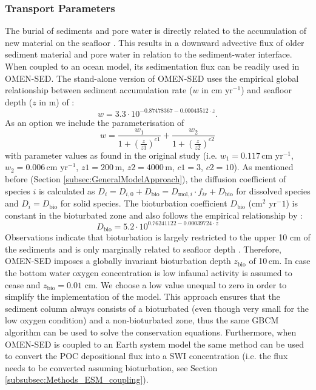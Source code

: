 \documentclass[gmd, manuscript]{copernicus}
\begin{document}
\subsubsection{Transport Parameters}
The burial of sediments and pore water is directly related to the accumulation of new material on the seafloor \citep[i.e. sedimentation,][]{burdige2006geochemistry}. 
This results in a downward advective flux of older sediment material and pore water in relation to the sediment-water interface. When coupled to an ocean model, its sedimentation flux can be readily used in OMEN-SED. 
The stand-alone version of OMEN-SED uses the empirical global relationship between sediment accumulation rate ($w$ in cm yr$^{-1}$) and seafloor depth ($z$ in m) of \citet{middelburg_empirical_1997}: 
\begin{equation}
 w = 3.3\cdot 10^{-0.87478367-0.00043512\cdot z}\label{eq:sedimentation_rate}.
\end{equation}
As an option we include the parameterisation of \citet{burwicz_estimation_2011} 
\begin{equation}
 w = \frac{w_1}{1 + (\frac{z}{z1})^{c1}} + \frac{w_2}{1 + (\frac{z}{z2})^{c2}}\label{eq:sedimentation_rate_Burwicz}
\end{equation}
with parameter values as found in the original study (i.e. $w_1=0.117$\,cm yr$^{-1}$, $w_2=0.006$\,cm yr$^{-1}$, $z1=200$\,m, $z2=4000$\,m, $c1=3$, $c2=10$).
As mentioned before (Section \ref{subsec:GeneralModelApproach}), the diffusion coefficient of species $i$ is calculated as $D_i=D_{i,0}+D_{\mathrm{bio}}=D_{\mathrm{mol},i}\cdot f_{ir}+D_{\mathrm{bio}}$ for dissolved species and $D_i=D_{\mathrm{bio}}$ for solid species. 
The bioturbation coefficient $D_{\mathrm{bio}}$ (cm$^2$ yr$^-1$) is constant in the bioturbated zone and also follows the empirical relationship by \citet{middelburg_empirical_1997}:
\begin{equation}
 D_{\mathrm{bio}} = 5.2\cdot 10^{0.76241122-0.00039724\cdot z}\label{eq:bioturbation_coeff}
\end{equation}
Observations indicate that bioturbation is largely restricted to the upper 10 cm of the sediments and is only marginally related to seafloor depth \citep[e.g.][]{boudreau_mean_1998, teal_global_2010}. 
Therefore, OMEN-SED imposes a globally invariant bioturbation depth $z_{\mathrm{bio}}$ of 10\,cm. In case the bottom water oxygen concentration is low 
\citep[here $<$4.5 nmol cm$^{-3}$ which is often used to define suboxic waters, e.g.][]{morrison1999oxygen, karstensen2008oxygen} infaunal activity is assumed to cease and $z_{\mathrm{bio}} = 0.01$ cm. We choose a low value unequal to zero in order to simplify the implementation of the model. 
This approach ensures that the sediment column always consists of a bioturbated (even though very small for the low oxygen condition) and a non-bioturbated zone, 
thus the same GBCM algorithm can be used to solve the conservation equations. Furthermore, when OMEN-SED is coupled to an Earth system model 
the same method can be used to convert the POC depositional flux into a SWI concentration (i.e. the flux needs to be converted assuming bioturbation, see Section \ref{subsubsec:Methods_ESM_coupling}). 
\end{document}
